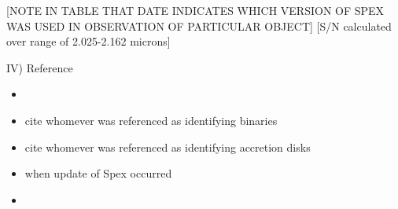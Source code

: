 

  [NOTE IN TABLE THAT DATE INDICATES WHICH VERSION OF SPEX WAS USED IN OBSERVATION OF PARTICULAR OBJECT]
  [S/N calculated over range of 2.025-2.162 microns]

IV) Reference\\
\begin{itemize}
\item \cite{Rayner_2003}\\
\item cite whomever was referenced as identifying binaries \cite{Adam_Krauss_or_other_paper}\\
\item cite whomever was referenced as identifying accretion disks \cite{disk_guy}\\
\item when update of Spex occurred \cite{Spex}\\
\item \cite{2mass_catalog_for_j_mags}
\end{itemize}  
  